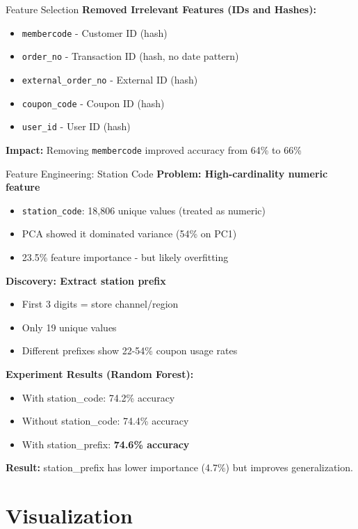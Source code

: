 \documentclass[aspectratio=169]{beamer}
\begin{document}
\begin{frame}{Feature Selection}
\textbf{Removed Irrelevant Features (IDs and Hashes):}
\begin{itemize}
    \item \texttt{membercode} - Customer ID (hash)
    \item \texttt{order\_no} - Transaction ID (hash, no date pattern)
    \item \texttt{external\_order\_no} - External ID (hash)
    \item \texttt{coupon\_code} - Coupon ID (hash)
    \item \texttt{user\_id} - User ID (hash)
\end{itemize}
\textbf{Impact:} Removing \texttt{membercode} improved accuracy from 64\% to 66\%
\end{frame}

\begin{frame}{Feature Engineering: Station Code}
\textbf{Problem: High-cardinality numeric feature}
\begin{itemize}
    \item \texttt{station\_code}: 18,806 unique values (treated as numeric)
    \item PCA showed it dominated variance (54\% on PC1)
    \item 23.5\% feature importance - but likely overfitting
\end{itemize}
\bigskip
\textbf{Discovery: Extract station prefix}
\begin{itemize}
    \item First 3 digits = store channel/region
    \item Only 19 unique values
    \item Different prefixes show 22-54\% coupon usage rates
\end{itemize}
\bigskip
\textbf{Experiment Results (Random Forest):}
\begin{itemize}
    \item With station\_code: 74.2\% accuracy
    \item Without station\_code: 74.4\% accuracy
    \item With station\_prefix: \textbf{74.6\% accuracy}
\end{itemize}
\bigskip
\textbf{Result:} station\_prefix has lower importance (4.7\%) but improves generalization.
\end{frame}

\section{Visualization}
\end{document}
